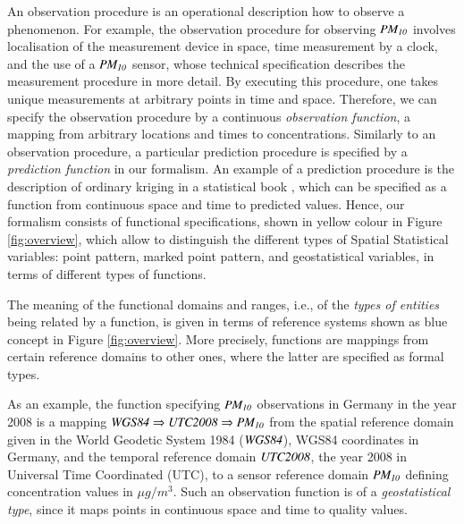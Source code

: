 \documentclass[final,authoryear,1p,times]{elsarticle}
\begin{document}
An observation procedure is an operational description how to observe a phenomenon. For example, the observation procedure for observing ${\it PM_{10}}$ involves localisation of the measurement device in space, time measurement by a clock, and the use of a ${\it PM_{10}}$ sensor, whose technical specification describes the measurement procedure in more detail. By executing this procedure, one takes unique measurements at arbitrary points in time and space. Therefore, we can specify the observation procedure by a continuous \textit{observation function}, a mapping from arbitrary locations and times to concentrations. Similarly to an observation procedure, a particular prediction procedure is specified by a \textit{prediction function} in our formalism. An example of a prediction procedure is the description of ordinary kriging in a statistical book \citep[p.145]{Cressie2011}, which can be specified as a function from continuous space and time to predicted values. Hence, our formalism consists of functional specifications, shown in yellow colour in Figure \ref{fig:overview}, which allow to distinguish the different types of Spatial Statistical variables: point pattern, marked point pattern, and geostatistical variables, in terms of different types of functions. 
 
The meaning of the functional domains and ranges, i.e., of the \textit{types of entities} being related by a function, is given in terms of reference systems shown as blue concept in Figure \ref{fig:overview}. More precisely, functions are mappings from certain reference domains to other ones, where the latter are specified as formal types. 

As an example, the function specifying ${\it PM_{10}}$ observations in Germany in the year 2008 is a mapping ${\it WGS84 \Rightarrow UTC2008 \Rightarrow PM_{10}}$ from the spatial reference domain given in the World Geodetic System 1984 (${\it WGS84}$), WGS84 coordinates in Germany, and the temporal reference domain ${\it UTC2008}$, the year 2008 in Universal Time Coordinated (UTC), to a sensor reference domain ${\it PM_{10}}$ defining concentration values in $\mu g/m^3$. Such an observation function is of a \textit{geostatistical type}, since it maps points in continuous space and time to quality values.
\end{document}

